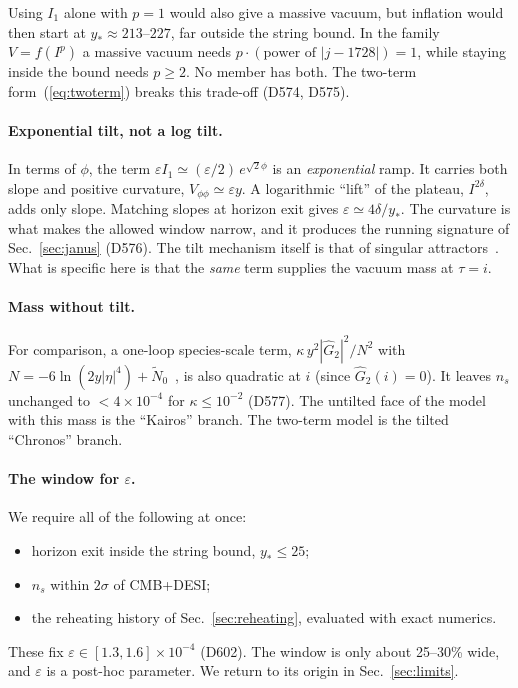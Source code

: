 \documentclass[aps,prd,twocolumn,superscriptaddress,nofootinbib,floatfix]{revtex4-2}
\begin{document}
Using $I_1$ alone with $p=1$ would also give a massive vacuum, but inflation would then start at $y_* \approx 213$--$227$, far outside the string bound. In the family $V = f(I^p)$ a massive vacuum needs $p\cdot(\text{power of }|j-1728|) = 1$, while staying inside the bound needs $p \geq 2$. No member has both. The two-term form~(\ref{eq:twoterm}) breaks this trade-off (D574, D575).

\paragraph{Exponential tilt, not a log tilt.} In terms of $\phi$, the term $\varepsilon I_1 \simeq (\varepsilon/2)\,e^{\sqrt2\phi}$ is an \emph{exponential} ramp. It carries both slope and positive curvature, $V_{\phi\phi} \simeq \varepsilon y$. A logarithmic ``lift'' of the plateau, $I^{2\delta}$, adds only slope. Matching slopes at horizon exit gives $\varepsilon \simeq 4\delta/y_*$. The curvature is what makes the allowed window narrow, and it produces the running signature of Sec.~\ref{sec:janus} (D576). The tilt mechanism itself is that of singular attractors~\cite{arXiv_2512_02969}. What is specific here is that the \emph{same} term supplies the vacuum mass at $\tau = i$.

\paragraph{Mass without tilt.} For comparison, a one-loop species-scale term, $\kappa\,y^2|\hat G_2|^2/N^2$ with $N = -6\ln(2y|\eta|^4)+\tilde N_0$~\cite{arXiv_2407_12081,arXiv_2507_05345}, is also quadratic at $i$ (since $\hat G_2(i) = 0$). It leaves $n_s$ unchanged to $<4\times10^{-4}$ for $\kappa \le 10^{-2}$ (D577). The untilted face of the model with this mass is the ``Kairos'' branch. The two-term model is the tilted ``Chronos'' branch.

\paragraph{The window for $\varepsilon$.} We require all of the following at once:
\begin{itemize}
\item horizon exit inside the string bound, $y_* \le 25$;
\item $n_s$ within $2\sigma$ of CMB+DESI;
\item the reheating history of Sec.~\ref{sec:reheating}, evaluated with exact numerics.
\end{itemize}
These fix $\varepsilon \in [1.3, 1.6]\times10^{-4}$ (D602). The window is only about 25--30\% wide, and $\varepsilon$ is a post-hoc parameter. We return to its origin in Sec.~\ref{sec:limits}.
\end{document}
